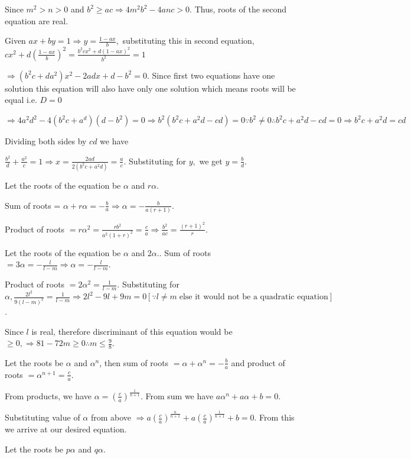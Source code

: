   Since $m^2 > n > 0$ and $b^2 \geq ac\Rightarrow 4m^2b^2 - 4anc > 0$. Thus, roots of the second equation are real.
\item Given $ax + by = 1 \Rightarrow y = \frac{1 - ax}{b},$ substituting this in second equation, $cx^2 +
  d\left(\frac{1 - ax}{b}\right)^2 = \frac{b^2cx^2 + d(1 - ax)^2}{b^2} = 1$

  $\Rightarrow (b^2c + da^2)x^2 - 2adx + d - b^2 = 0$. Since first two equations have one solution this
  equation will also have only one solution which means roots will be equal i.e. $D = 0$

  $\Rightarrow 4a^2d^2 - 4(b^2c + a^d)(d - b^2) = 0\Rightarrow b^2(b^2c + a^2d - cd) = 0\because b^2 \ne 0
  \therefore b^2c + a^2d - cd = 0 \Rightarrow b^2c + a^2d = cd$

  Dividing both sides by $cd$ we have

  $\frac{b^2}{d} + \frac{a^2}{c} = 1\Rightarrow x = \frac{2ad}{2(b^2c + a^2d)} = \frac{a}{c}$. Substituting
  for $y,$ we get $y = \frac{b}{d}$.
\item Let the roots of the equation be $\alpha$ and $r\alpha$.

  Sum of roots = $\alpha + r\alpha = -\frac{b}{a} \Rightarrow \alpha = -\frac{b}{a(r + 1)}$.

  Product of roots $= r\alpha^2 = \frac{rb^2}{a^2(1 + r)^2} = \frac{c}{a} \Rightarrow \frac{b^2}{ac} =
  \frac{(r + 1)^2}{r}$.
\item Let the roots of the equation be $\alpha$ and $2\alpha.$. Sum of roots $= 3\alpha = -\frac{l}{l - m}
  \Rightarrow \alpha = -\frac{l}{l - m}$.

  Product of roots $= 2\alpha^2 = \frac{1}{l - m}$. Substituting for $\alpha, \frac{2l^2}{9(l - m)^2} =
  \frac{1}{l - m} \Rightarrow 2l^2- 9l + 9m = 0 [\because l\neq m\;\text{else it would not be a quadratic
      equation}]$.

  Since $l$ is real, therefore discriminant of this equation would be $\geq 0, \Rightarrow 81 - 72m \geq 0
  \therefore m \leq \frac{9}{8}$.
\item Let the roots be $\alpha$ and $\alpha^n$, then sum of roots $= \alpha + \alpha^n = -\frac{b}{a}$ and
  product of roots $= \alpha^{n + 1} = \frac{c}{a}$.

  From products, we have $\alpha = \left(\frac{c}{a}\right)^{\frac{1}{n + 1}}$. From sum we have $a\alpha^n + a\alpha + b = 0$.

  Substituting value of $\alpha$ from above $\Rightarrow a\left(\frac{c}{a}\right)^{\frac{n}{n + 1}} +
  a\left(\frac{c}{a}\right)^{\frac{1}{n + 1}} + b = 0$.  From this we arrive at our desired equation.
\item Let the roots be $p\alpha$ and $q\alpha$.

